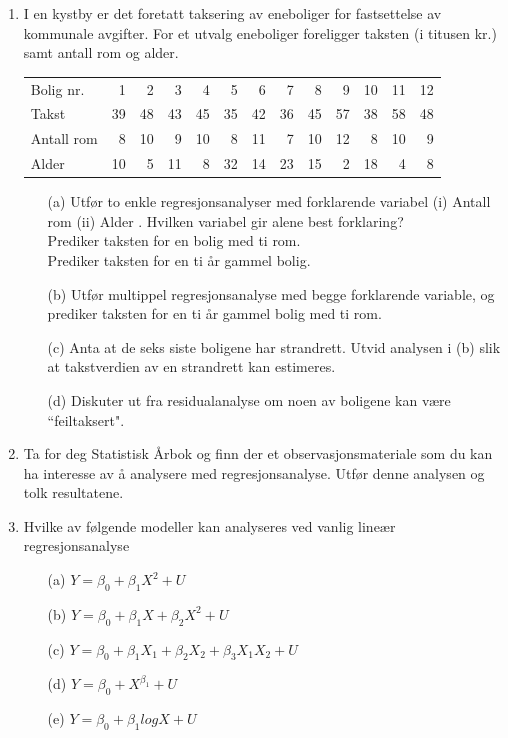 \begin{enumerate}
\item  I en kystby er det foretatt taksering av eneboliger for fastsettelse
av kommunale avgifter.  For et utvalg eneboliger foreligger taksten 
(i titusen kr.) samt antall rom og alder.
\begin{center} \addtolength{\tabcolsep}{-0.1\tabcolsep}
\begin{tabular}{lrrrrrrrrrrrr}
Bolig nr.& 1 & 2 &  3  &  4  &  5  &  6  &  7  &  8  &  9  &  10  &  11 & 12 \\
Takst   &39 & 48 & 43  & 45  & 35  & 42  & 36  & 45  & 57  &  38  &  58 & 48 \\
Antall rom &8&10 &  9  & 10  &  8  & 11  &  7  & 10  & 12  &   8  &  10 &  9 \\
Alder    &10&  5 & 11  &  8  & 32  & 14  & 23  & 15  &  2  &  18  &   4 &  8
\end{tabular}
\end{center}
\begin{itemize}
\item[(a)] Utfør to enkle regresjonsanalyser med forklarende variabel
  (i) Antall rom  (ii)  Alder . Hvilken variabel gir alene best forklaring? \\
  Prediker taksten for en bolig med ti rom.\\
  Prediker taksten for en ti år gammel bolig.
\item[(b)] Utfør multippel regresjonsanalyse med begge forklarende
  variable, og prediker taksten for en ti år gammel bolig med ti rom.
\item[(c)] Anta at de seks siste boligene har strandrett.  Utvid analysen
  i (b) slik at takstverdien av en strandrett kan estimeres.
\item[(d)]  Diskuter ut fra residualanalyse om noen av boligene kan være
  ``feiltaksert".
\end{itemize}

\item  Ta for deg Statistisk Årbok og finn der et observasjonsmateriale 
som du kan ha interesse av å analysere med regresjonsanalyse.  Utfør
denne analysen og tolk resultatene.

\item  Hvilke av følgende modeller kan analyseres ved vanlig lineær
regresjonsanalyse

\begin{itemize}
\item[(a)]  $Y = {\beta}_0 + {\beta}_1X^2 + U $
\item[(b)]  $Y = {\beta}_0 + {\beta}_1X + {\beta}_2X^2 + U$
\item[(c)]  $Y = {\beta}_0 + {\beta}_1X_1 + {\beta}_2X_2 + {\beta}_3X_1X_2 +U$
\item[(d)]  $Y = {\beta}_0 + X^{{\beta}_1} + U $
\item[(e)]  $Y = {\beta}_0 + {\beta}_1 logX+U$
\end{itemize}


\end{enumerate}
